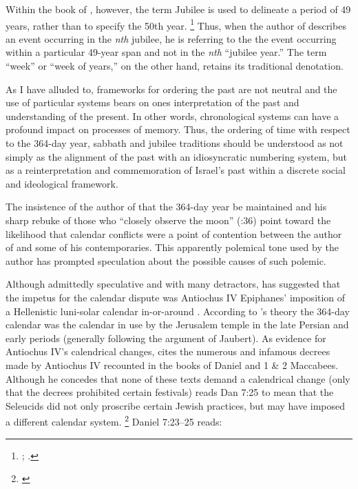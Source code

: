 Within the book of \jub, however, the term Jubilee is used to delineate a period of 49 years, rather than to specify the 50th year.%
    \footnote{\cite[524--525]{vanderkam-b_vanderkam2000}; \cite[234]{bergsma2007}.}
Thus, when the author of \jub describes an event occurring in the \emph{nth} jubilee, he is referring to the the event occurring within a particular 49-year span and not in the \emph{nth} ``jubilee year.'' The term ``week'' or ``week of years,'' on the other hand, retains its traditional denotation.

As I have alluded to, frameworks for ordering the past are not neutral and the use of particular systems bears on ones interpretation of the past and understanding of the present. In other words, chronological systems can have a profound impact on processes of memory. Thus, the ordering of time with respect to the 364-day year, sabbath and jubilee traditions should be understood as not simply as the alignment of the past with an idiosyncratic numbering system, but as a reinterpretation and commemoration of Israel's past within a discrete social and ideological framework. 

The insistence of the author of \jub that the 364-day year be maintained and his sharp rebuke of those who ``closely observe the moon'' (:36) point toward the likelihood that calendar conflicts were a point of contention between the author of \jub and some of his contemporaries. This apparently polemical tone used by the author has prompted speculation about the possible causes of such polemic. 

Although admittedly speculative and with many detractors, \vanderkam has suggested that the impetus for the calendar dispute was Antiochus IV Epiphanes' imposition of a Hellenistic luni-solar calendar in-or-around . According to \vanderkam's theory the 364-day calendar was the calendar in use by the Jerusalem temple in the late Persian and early \secondtemple periods (generally following the argument of Jaubert). As evidence for Antiochus IV's calendrical changes, \vanderkam cites the numerous and infamous decrees made by Antiochus IV recounted in the books of Daniel and 1 \& 2 Maccabees. Although he concedes that none of these texts demand a calendrical change (only that the decrees prohibited certain festivals) \vanderkam reads Dan 7:25 to mean that the Seleucids did not only proscribe certain Jewish practices, but may have imposed a different calendar system.%
    \footnote{\cite[59--60; 68--69]{vanderkam_jsj1981}}
Daniel 7:23--25 reads:

